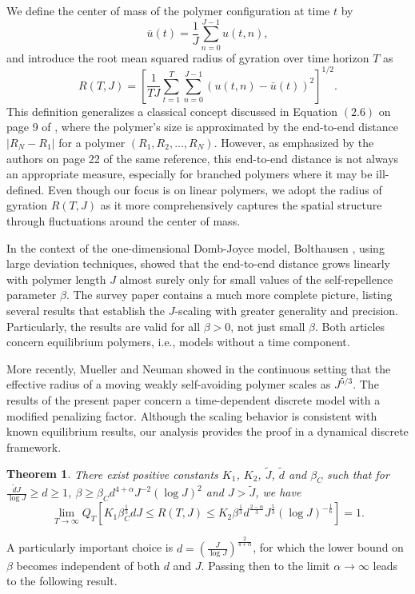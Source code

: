 \documentclass[12pt]{amsart}
\newtheorem{theorem}{Theorem}[section]
\numberwithin{equation}{section}
\newcommand{\1}{\mathbf{1}}
\begin{document}
We define the center of mass of the polymer configuration at time $t$ by
\begin{equation}
\label{ubar}
\bar{u}(t) = \frac{1}{J}\sum_{n=0}^{J-1}u(t,n),
\end{equation}
and introduce the root mean squared radius of gyration over time horizon $T$ as
\begin{equation}
\label{RTJ}
R(T,J) = \left[\frac{1}{TJ}\sum_{t=1}^T\sum_{n=0}^{J-1}(u(t,n)-\bar{u}(t))^2\right]^{1/2}.
\end{equation}
This definition generalizes a classical concept discussed in Equation $(2.6)$ on page 9 of \cite{doi1988theory}, where the polymer's size is approximated by the end-to-end distance $|R_N-R_1|$ for a polymer $(R_1,R_2,...,R_N)$. However, as emphasized by the authors on page 22 of the same reference, this end-to-end distance is not always an appropriate measure, especially for branched polymers where it may be ill-defined. Even though our focus is on linear polymers, we adopt the radius of gyration $R(T,J)$ as it more comprehensively captures the spatial structure through fluctuations around the center of mass.

In the context of the one-dimensional Domb-Joyce model, Bolthausen \cite{bolthausen1990self}, using large deviation techniques, showed that the end-to-end distance grows linearly with polymer length $J$ almost surely only for small values of the self-repellence parameter $\beta$. The survey paper \cite{van2001survey} contains a much more complete picture, listing several results that establish the $J$-scaling with greater generality and precision. Particularly, the results are valid for all $\beta > 0$, not just small $\beta$. Both articles concern equilibrium polymers, i.e., models without a time component. 

More recently, Mueller and Neuman \cite{mueller2022scaling} showed in the continuous setting that the effective radius of a moving weakly self-avoiding polymer scales as $J^{5/3}$. The results of the present paper concern a time-dependent discrete model with a modified penalizing factor. Although the scaling behavior is consistent with known equilibrium results, our analysis provides the proof in a dynamical discrete framework.

\begin{theorem}
    \label{preTh}
    There exist positive constants $K_1$, $K_2$, $\tilde{J}$, $\tilde{d}$ and $\beta_C$ such that for $\frac{\tilde{d}J}{\log J}\geq d\geq 1$, $\beta \geq\beta_Cd^{4+\alpha}J^{-2}(\log J)^{2}$ and $J>\tilde{J}$, we have
    \begin{equation*}
        \lim_{T\to\infty}Q_T\left[K_1\beta_C^{\frac{1}{3}}d J\leq R(T,J)\leq K_2\beta^{\frac{1}{3}}d^{\frac{2-\alpha}{3}}J^{\frac{5}{3}}(\log J)^{-\frac{1}{6}}\right]=1.
    \end{equation*}
\end{theorem}
A particularly important choice is $d=\left(\frac{J}{\log J}\right)^{\frac{2}{4+\alpha}}$, for which the lower bound on $\beta$ becomes independent of both $d$ and $J$. Passing then to the limit $\alpha\to\infty$ leads to the following result.
\end{document}
